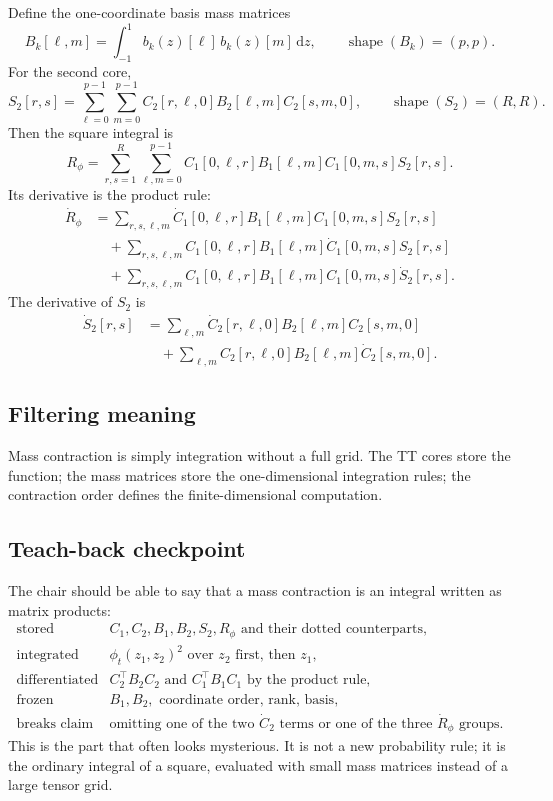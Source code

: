 \documentclass[11pt]{article}
\newcommand{\dd}{\,\mathrm d}
\newcommand{\shape}{\operatorname{shape}}
\begin{document}
Define the one-coordinate basis mass matrices
\[
    B_k[\ell,m]
    =
    \int_{-1}^{1}b_k(z)[\ell]\,b_k(z)[m]\dd z,
    \qquad
    \shape(B_k)=(p,p).
    \tag{P21-35}
\]
For the second core,
\[
    S_2[r,s]
    =
    \sum_{\ell=0}^{p-1}\sum_{m=0}^{p-1}
    C_2[r,\ell,0]B_2[\ell,m]C_2[s,m,0],
    \qquad
    \shape(S_2)=(R,R).
    \tag{P21-36}
\]
Then the square integral is
\[
    R_\phi
    =
    \sum_{r,s=1}^{R}
    \sum_{\ell,m=0}^{p-1}
    C_1[0,\ell,r]B_1[\ell,m]C_1[0,m,s]S_2[r,s].
    \tag{P21-37}
\]
Its derivative is the product rule:
\[
\begin{aligned}
    \dot R_\phi
    &=
    \sum_{r,s,\ell,m}
    \dot C_1[0,\ell,r]B_1[\ell,m]C_1[0,m,s]S_2[r,s]\\
    &\quad+
    \sum_{r,s,\ell,m}
    C_1[0,\ell,r]B_1[\ell,m]\dot C_1[0,m,s]S_2[r,s]\\
    &\quad+
    \sum_{r,s,\ell,m}
    C_1[0,\ell,r]B_1[\ell,m]C_1[0,m,s]\dot S_2[r,s].
\end{aligned}
    \tag{P21-38}
\]
The derivative of \(S_2\) is
\[
\begin{aligned}
    \dot S_2[r,s]
    &=
    \sum_{\ell,m}
    \dot C_2[r,\ell,0]B_2[\ell,m]C_2[s,m,0]\\
    &\quad+
    \sum_{\ell,m}
    C_2[r,\ell,0]B_2[\ell,m]\dot C_2[s,m,0].
\end{aligned}
    \tag{P21-39}
\]

\subsection*{Filtering meaning}

Mass contraction is simply integration without a full grid.  The TT cores
store the function; the mass matrices store the one-dimensional integration
rules; the contraction order defines the finite-dimensional computation.

\subsection*{Teach-back checkpoint}

The chair should be able to say that a mass contraction is an integral written
as matrix products:
\[
\begin{array}{ll}
\text{stored} & C_1,C_2,B_1,B_2,S_2,R_\phi
    \text{ and their dotted counterparts},\\[1mm]
\text{integrated} & \phi_t(z_1,z_2)^2
    \text{ over } z_2 \text{ first, then } z_1,\\[1mm]
\text{differentiated} &
    C_2^\top B_2 C_2 \text{ and } C_1^\top B_1 C_1
    \text{ by the product rule},\\[1mm]
\text{frozen} & B_1,B_2,\text{ coordinate order, rank, basis},\\[1mm]
\text{breaks claim} &
    \text{omitting one of the two } \dot C_2
    \text{ terms or one of the three } \dot R_\phi \text{ groups.}
\end{array}
\tag{P21-39a}
\]
This is the part that often looks mysterious.  It is not a new probability
rule; it is the ordinary integral of a square, evaluated with small mass
matrices instead of a large tensor grid.
\end{document}
